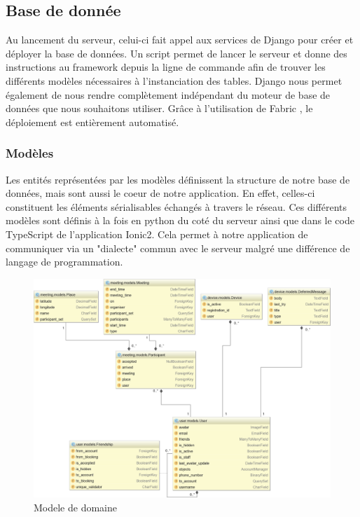 \documentclass[french]{article}
\begin{document}
	\newpage
	
	\subsection{Base de donnée}	
	Au lancement du serveur, celui-ci fait appel aux services de Django pour créer et déployer la base de données. Un script permet de lancer le serveur et donne des instructions au framework depuis la ligne de commande afin de trouver les différents modèles nécessaires à l'instanciation des tables.
	Django nous permet également de nous rendre complètement indépendant du moteur de base de données que nous souhaitons utiliser.
	Grâce à l'utilisation de Fabric \cite{fabric}, le déploiement est entièrement automatisé.
	\subsubsection{Modèles}
	
	Les entités représentées par les modèles définissent la structure de notre base de données, mais sont aussi le coeur de notre application. 
	En effet, celles-ci constituent les éléments sérialisables échangés à travers le réseau. 
	Ces différents modèles sont définis à la fois en python du coté du serveur ainsi que dans le code TypeScript de l'application Ionic2. Cela permet à notre application de communiquer via un "dialecte" commun avec le serveur malgré une différence de langage de programmation.

	\begin{figure}[H]
		\centering
		\includegraphics[scale=0.45]{../schema/modele-domaine.png}
		\caption{Modele de domaine}
		\label{Modele de domaine}
	\end{figure}
	
\end{document}
